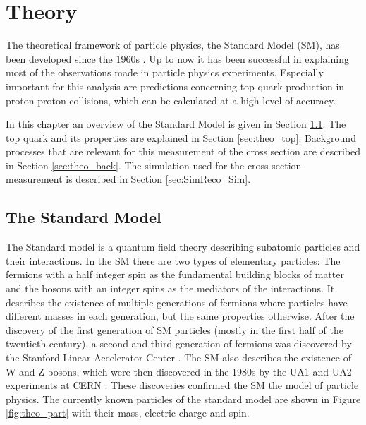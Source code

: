 
\chapter{Theory}
\label{sec:theo}

The theoretical framework of particle physics, the Standard Model (SM), has been developed since the 1960s \cite{GellMann:1961ky,Weinberg:1967tq}.
Up to now it has been successful in explaining most of the observations made in particle physics experiments. 
Especially important for this analysis are predictions concerning top quark production in 
proton-proton collisions, which can be calculated at a high level of accuracy.

In this chapter an overview of the Standard Model is given in Section \ref{sec:theo_sm}. 
The top quark and its properties are explained in Section \ref{sec:theo_top}.
Background processes that are relevant for this measurement of the \ttbar cross section are described in Section \ref{sec:theo_back}.
The simulation used for the \ttbar cross section measurement is described in Section \ref{sec:SimReco_Sim}.


\section{The Standard Model}
\label{sec:theo_sm}

The Standard model is a quantum field theory describing subatomic particles and their interactions.
In the SM there are two types of elementary particles: The fermions with a half integer spin as the fundamental building blocks of matter and 
the bosons with an integer spins as the mediators of the interactions.
It describes the existence of multiple generations of fermions where particles have different masses in each generation, but the same properties otherwise.
After the discovery of the first generation of SM particles (mostly in the first half of the twentieth century), a second and third generation of fermions was discovered by the Stanford Linear Accelerator Center \cite{PhysRevLett.23.935,PhysRevLett.23.930}.
The SM also describes the existence of W and Z bosons, which were then discovered in the 1980s by the UA1 and UA2 experiments at CERN \cite{ARNISON1983103,1983398,BANNER1983476,BAGNAIA1983130}.
These discoveries confirmed the SM the model of particle physics.
The currently known particles of the standard model are shown in Figure \ref{fig:theo_part} with their mass, electric charge and spin.


